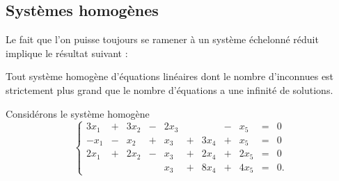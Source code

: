 \documentclass[class=report,crop=false]{standalone}
\begin{document}
%
%
%




\subsection{Systèmes homogènes}

Le fait que l'on puisse toujours se ramener à un système échelonné
réduit implique le résultat suivant :
\begin{theoreme}
Tout système homogène d'équations linéaires dont le nombre d'inconnues est
strictement plus grand que le nombre d'équations a une infinité de solutions.
\end{theoreme}

\begin{exemple} Considérons le système homogène
\[\left\{
 \begin{array}{ccccccccccc}
3x_1 &+ &3x_2 &- &2x_3 &&&- &x_5 & = & 0\\
 -x_1 &- &x_2 &+ &x_3 &+ &3x_4 &+ &x_5 & = & 0\\
 2x_1 &+ &2x_2 &- &x_3 &+ &2x_4 &+ &2x_5 & = & 0\\
 &&&&x_3 &+ &8x_4 &+ &4x_5 & = & 0.
\end{array} \right.
\] \end{exemple}
\end{document}
